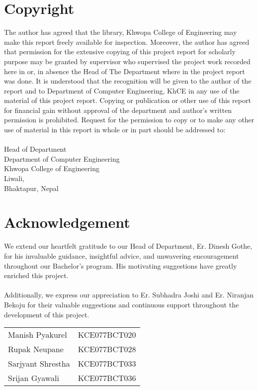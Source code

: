 \large
	\chapter*{Copyright}
\normalsize
{}
	The author has agreed that the library, Khwopa College of Engineering  may make this report freely available for inspection. Moreover, the author has agreed that permission for the extensive copying of this project report for scholarly purpose may be granted by supervisor who supervised the project work recorded here in or, in absence the Head of The Department where in the project report was done. It is understood that the recognition will be given to the author of the report and to Department of Computer Engineering, KhCE in any use of the material of this project report. Copying or publication or other use of this report for financial gain without approval of the department and author’s written permission is prohibited. Request for the permission to copy or to make any other use of material in this report in whole or in part should be addressed to: \\
	\vspace{1cm} \\
	Head of Department \\
	Department of Computer Engineering\\
	Khwopa College of Engineering\\
	Liwali,\\
	Bhaktapur, Nepal\\
\pagebreak


\large
\chapter*{Acknowledgement}
\normalsize
{}
We extend our heartfelt gratitude to our Head of Department, Er. Dinesh Gothe, for his invaluable guidance, insightful advice, and unwavering encouragement throughout our Bachelor's program. His motivating suggestions have greatly enriched this project.\\\\
Additionally, we express our appreciation to Er. Subhadra Joshi and Er. Niranjan Bekoju for their valuable suggestions and continuous support throughout the development of this project.
\begin{table}[h]
	\begin{tabular}{@{}ll}
		Manish Pyakurel    & KCE077BCT020 \\
		Rupak Neupane      & KCE077BCT028 \\
		Sarjyant Shrestha  & KCE077BCT033 \\
		Srijan Gyawali     & KCE077BCT036 \\
	\end{tabular}
\end{table}
\pagebreak


